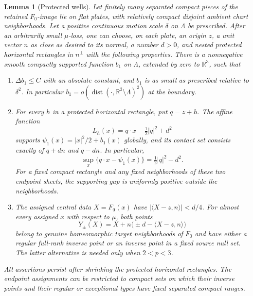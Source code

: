 \documentclass[11pt]{article}
\numberwithin{equation}{section}
\newtheorem{lemma}[theorem]{Lemma}
\theoremstyle{definition}
\theoremstyle{remark}
\begin{document}
\begin{lemma}[Protected wells]\label{hp:wells}
Let finitely many separated compact pieces of the retained $F_0$-image
lie on flat plates, with relatively compact disjoint ambient chart
neighborhoods.  Let a positive continuous motion scale $\delta$ on
$\Lambda$ be prescribed.  After an arbitrarily small $\mu$-loss, one can
choose, on each plate, an origin $z$, a unit vector $n$ as close as
desired to its normal, a number $d>0$, and nested protected horizontal
rectangles in $n^\perp$ with the following properties.
There is a nonnegative smooth compactly supported function $b_1$ on
$\Lambda$, extended by zero to $\mathbb R^3$, such that
\begin{enumerate}[label=\textup{(\roman*)}]
\item $\Delta b_1\leq C$ with an absolute constant, and $b_1$ is as
small as prescribed relative to $\delta^2$.  In particular
$b_1=o(\operatorname{dist}(\cdot,\mathbb R^3\setminus\Lambda)^2)$ at the boundary.
\item For every $h$ in a protected horizontal rectangle, put $q=z+h$.
The affine function
\[
 L_h(x)=q\cdot x-\tfrac12|q|^2+d^2
\]
supports $\psi_1(x)=|x|^2/2+b_1(x)$ globally, and its contact set
consists exactly of $q+dn$ and $q-dn$.  In particular,
\begin{equation}\label{hp:paired-dual-value}
 \sup_x\{q\cdot x-\psi_1(x)\}=\tfrac12|q|^2-d^2.
\end{equation}
For a fixed compact rectangle and any fixed neighborhoods of these
two endpoint sheets, the supporting gap is uniformly positive outside
the neighborhoods.
\item The assigned central data $X=F_0(x)$ have
$|\langle X-z,n\rangle|<d/4$.  For almost every assigned $x$ with
respect to $\mu$, both points
\begin{equation}\label{hp:sampled-endpoints}
 Y_\pm(X)=X+n\bigl(\pm d-\langle X-z,n\rangle\bigr)
\end{equation}
belong to genuine homeomorphic target neighborhoods of $F_0$ and have
either a regular full-rank inverse point or an inverse point in a fixed
source null set.  The latter alternative is needed only when $2<p<3$.
\end{enumerate}
All assertions persist after shrinking the protected horizontal
rectangles.  The endpoint assignments can be restricted to compact
sets on which their inverse points and their regular or exceptional
types have fixed separated compact ranges.
\end{lemma}
\end{document}
